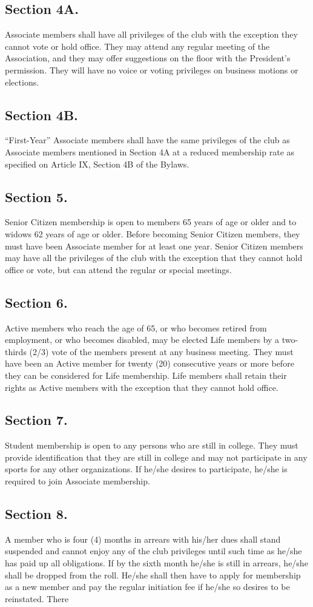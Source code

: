 \documentclass[12pt,letterpaper]{article}
\begin{document}
\subsection*{Section 4A.}
Associate members shall have all privileges of the club with the
exception they cannot vote or hold office. They may attend any regular meeting of the
Association, and they may offer suggestions on the floor with the President’s permission.
They will have no voice or voting privileges on business motions or elections.
\subsection*{Section 4B.}
“First-Year” Associate members shall have the same privileges of the
club as Associate members mentioned in Section 4A at a reduced membership rate as
specified on Article IX, Section 4B of the Bylaws.
\subsection*{Section 5.} Senior Citizen membership is open to members 65 years of age or older and
to widows 62 years of age or older. Before becoming Senior Citizen members, they
must have been Associate member for at least one year. Senior Citizen members may
have all the privileges of the club with the exception that they cannot hold office or vote,
but can attend the regular or special meetings.
\subsection*{Section 6.} Active members who reach the age of 65, or who becomes retired from
employment, or who becomes disabled, may be elected Life members by a two-thirds
(2/3) vote of the members present at any business meeting. They must have been an
Active member for twenty (20) consecutive years or more before they can be considered
for Life membership. Life members shall retain their rights as Active members with the
exception that they cannot hold office.
\subsection*{Section 7.} Student membership is open to any persons who are still in college. They
must provide identification that they are still in college and may not participate in any
sports for any other organizations. If he/she desires to participate, he/she is required to
join Associate membership.
\subsection*{Section 8.} A member who is four (4) months in arrears with his/her dues shall stand
suspended and cannot enjoy any of the club privileges until such time as he/she has
paid up all obligations. If by the sixth month he/she is still in arrears, he/she shall be
dropped from the roll. He/she shall then have to apply for membership as a new
member and pay the regular initiation fee if he/she so desires to be reinstated. There
\end{document}
